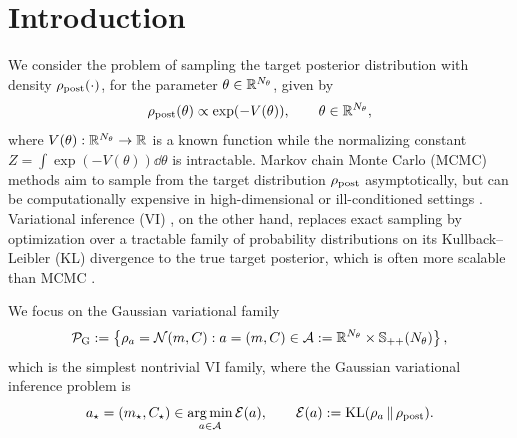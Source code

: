 \section{Introduction}
\label{sec:intro}

We consider the problem of sampling the target posterior distribution with
density $\rho_{\mathrm{post}} (\cdot)$, for the parameter $\theta \in \mathbb{R}^{N_\theta}$,
given by
\begin{equation*}
    \rho_{\mathrm{post}} (\theta) \propto \exp (-V(\theta)), \qquad \theta \in \mathbb{R}^{N_\theta},
\end{equation*}
where $V(\theta) : \mathbb{R}^{N_\theta} \to \mathbb{R}$ is a known function while the
normalizing constant $Z = \int \exp (-V(\theta)) \dd \theta$ is intractable.
Markov chain Monte Carlo (MCMC) methods \cite{brooks2011handbook} aim to sample
from the target distribution $\rho_{\mathrm{post}}$ asymptotically, but can be
computationally expensive in high-dimensional or ill-conditioned settings
\cite{JMLR:v23:20-357}. Variational inference (VI) \cite{blei2017variational},
on the other hand, replaces exact sampling by optimization over a tractable
family of probability distributions on its Kullback--Leibler (KL) divergence to
the true target posterior, which is often more scalable than MCMC
\cite{JMLR:v14:hoffman13a}.

We focus on the Gaussian variational family
\begin{equation*}
    \mathcal{P}_{\mathrm{G}} := \left\{ \rho_a = \mathcal{N}(m,C) : a=(m,C)\in \mathcal{A} := \mathbb{R}^{N_\theta} \times \mathbb{S}_{++}(N_\theta) \right\},
\end{equation*}
which is the simplest nontrivial VI family, where the Gaussian variational
inference problem is
\begin{equation*}
    a_\star = (m_\star,C_\star) \in \operatorname*{arg\,min}_{a\in\mathcal{A}} \mathcal{E}(a),
    \qquad \mathcal{E}(a) := \mathrm{KL}(\rho_a\,\|\,\rho_{\mathrm{post}}).
\end{equation*}

